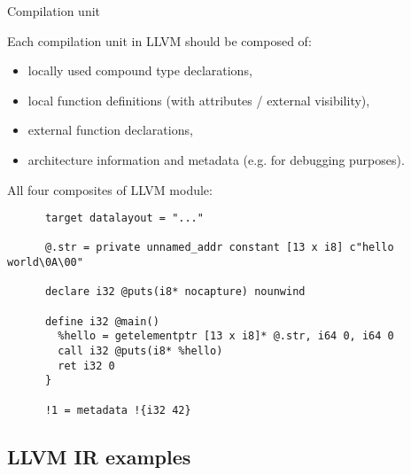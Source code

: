 \documentclass[8pt]{beamer}
\begin{document}
\begin{frame}[fragile]{Compilation unit}
  \begin{block}{Each compilation unit in LLVM should be composed of:}
    \begin{itemize}
      \item locally used compound type declarations,
      \item local function definitions (with attributes / external visibility),
      \item external function declarations,
      \item architecture information and metadata (e.g. for debugging
        purposes).
    \end{itemize}
  \end{block}

  \begin{exampleblock}{All four composites of LLVM module:}
    \begin{verbatim}
      target datalayout = "..."

      @.str = private unnamed_addr constant [13 x i8] c"hello world\0A\00"

      declare i32 @puts(i8* nocapture) nounwind

      define i32 @main() 
        %hello = getelementptr [13 x i8]* @.str, i64 0, i64 0
        call i32 @puts(i8* %hello)
        ret i32 0
      }

      !1 = metadata !{i32 42}
    \end{verbatim}
  \end{exampleblock}
\end{frame}

\subsection*{LLVM IR examples}
\end{document}
